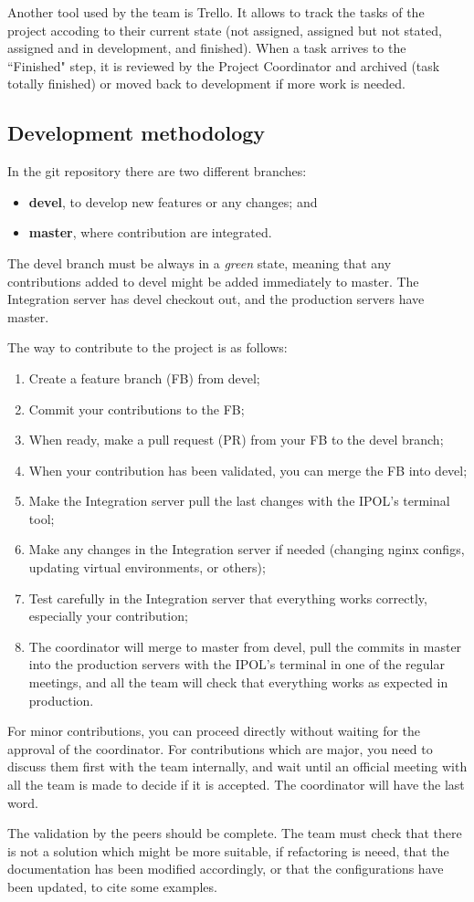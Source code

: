 Another tool used by the team is Trello. It allows to track the tasks of the project accoding to their current state (not assigned, assigned but not stated, assigned and in development, and finished). When a task arrives to the ``Finished" step, it is reviewed by the Project Coordinator and archived (task totally finished) or moved back to development if more work is needed.

\subsection{Development methodology}
In the git repository there are two different branches:
\begin{itemize}
	\item \textbf{devel}, to develop new features or any changes; and
	\item \textbf{master}, where contribution are integrated.
\end{itemize}

The devel branch must be always in a \emph{green} state, meaning that any contributions added to devel might be added immediately to master. The Integration server has devel checkout out, and the production servers have master.

The way to contribute to the project is as follows:
\begin{enumerate}
	\item Create a feature branch (FB) from devel;
	\item Commit your contributions to the FB;
	\item When ready, make a pull request (PR) from your FB to the devel branch;
	\item When your contribution has been validated, you can merge the FB into devel;
	\item Make the Integration server pull the last changes with the IPOL's terminal tool;
	\item Make any changes in the Integration server if needed (changing nginx configs, updating virtual environments, or others);
	\item Test carefully in the Integration server that everything works correctly, especially your contribution;
	\item The coordinator will merge to master from devel, pull the commits in master into the production servers with the IPOL's terminal in one of the regular meetings, and all the team will check that everything works as expected in production.
\end{enumerate}

For minor contributions, you can proceed directly without waiting for the approval of the coordinator.
For contributions which are major, you need to discuss them first with the team internally, and wait until an official meeting with all the team is made to decide if it is accepted. The coordinator will have the last word.

The validation by the peers should be complete. The team must check that there is not a solution which might be more suitable, if refactoring is neeed, that the documentation has been modified accordingly, or that the configurations have been updated, to cite some examples.

